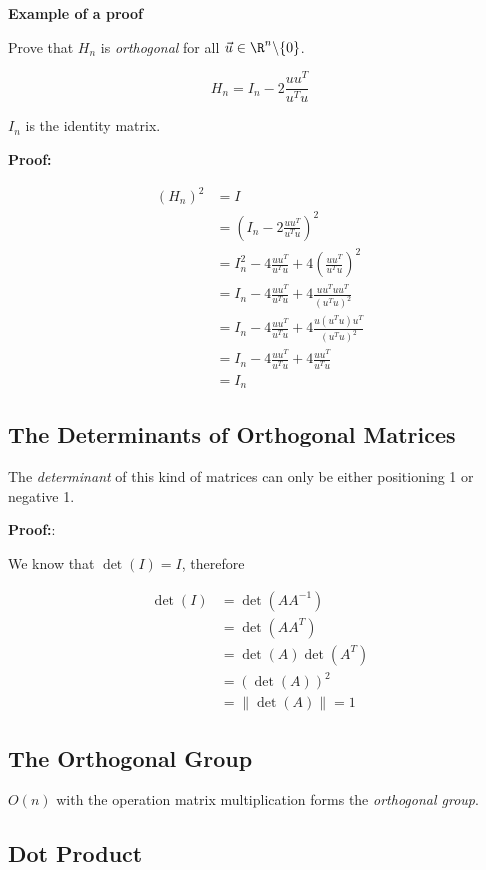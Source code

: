\textbf{Example of a proof}

Prove that \(H_n\) is \emph{orthogonal} for all \(\vec{u}\in \R^n \backslash \{0\} \).

\[
    H_n = I_n - 2 \frac{uu^T}{u^Tu}
\]

\(I_n\) is the identity matrix.

\textbf{Proof:}

\begin{align*}
    (H_n)^2 &= I \\
    &= \left(I_n - 2 \frac{uu^T}{u^Tu}\right)^2\\
    &= I_n^2 - 4\frac{uu^T}{u^Tu} + 4\left(\frac{uu^T}{u^Tu}\right)^2\\
    &= I_n -4\frac{uu^T}{u^Tu} +4\frac{uu^T uu^T}{(u^Tu)^2}\\ 
    &= I_n -4\frac{uu^T}{u^Tu} +4\frac{u(u^T u)u^T}{(u^Tu)^2}\\ 
    &= I_n -4\frac{uu^T}{u^Tu} +4\frac{uu^T}{u^Tu}\\ 
    &= I_n
\end{align*}

\QED

\subsection{The Determinants of Orthogonal Matrices}

The \emph{determinant} of this kind of matrices can only be either positioning 1 or negative 1.

\textbf{Proof:}:

We know that \(\det(I) = I \), therefore

\begin{align*}
    \det(I) &= \det(A A^{-1}) \\
            &= \det(A A^T) \\
            &= \det(A) \det(A^T) \\
            &= (\det(A))^2 \\
            &= \|\det (A) \| = 1
\end{align*}

\QED

\subsection{The Orthogonal Group}

\(O(n)\) with the operation matrix multiplication forms the \emph{orthogonal group}.

\subsection{Dot Product}

